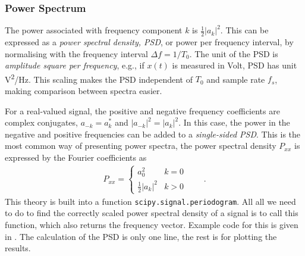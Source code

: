 


\subsubsection{Power Spectrum}
The power associated with frequency component $k$ is $\tfrac{1}{2}|a_k|^2$. This can be expressed as a \emph{power spectral density, PSD}, or power per frequency interval, by normalising with the frequency interval $\Delta f=1/T_0$. The unit of the PSD is \emph{amplitude square per frequency}, e.g., if $x(t)$ is measured in \unit{Volt}, PSD has unit \unit{V^2/Hz}. This scaling makes the PSD independent of $T_0$ and sample rate $f_s$, making comparison between spectra easier.

For a real-valued signal, the positive and negative frequency coefficients are complex conjugates, $a_{-k}=a_k^*$ and $|a_{-k}|^2=|a_k|^2$. In this case, the power in the negative and positive frequencies can be added to a \emph{single-sided PSD}. 
This is the most common way of presenting power spectra, the power spectral density $P_{xx}$ is expressed by the Fourier coefficients as 
\begin{align}
	P_{xx} = \begin{cases} a_0^2	& k=0 \\ \tfrac{1}{2} |a_k|^2 	& k >0 \end{cases}  \qquad .
\end{align}
This theory is built into a \scipy function \verb|scipy.signal.periodogram|. All all we need to do to find the correctly scaled power spectral density of a signal is to call this function, which also returns the frequency vector. Example code for this is given in . The calculation of the PSD is only one line, the rest is for plotting the results. 



